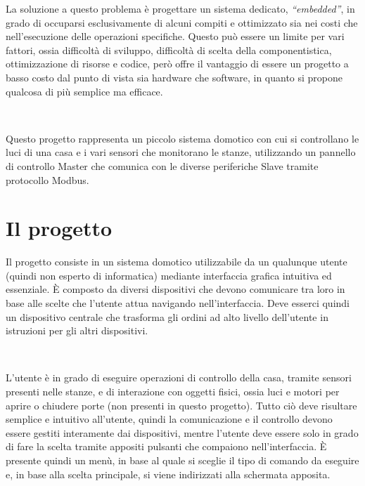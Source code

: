 \documentclass[a4paper,titlepage]{book}
\begin{document}
La soluzione a questo problema è progettare un sistema dedicato, \textit{``embedded''}, in grado di occuparsi esclusivamente di alcuni compiti e ottimizzato sia nei costi che nell'esecuzione delle operazioni specifiche. Questo può essere un limite per vari fattori, ossia difficoltà di sviluppo, difficoltà di scelta della componentistica, ottimizzazione di risorse e codice, però offre il vantaggio di essere un progetto a basso costo dal punto di vista sia hardware che software, in quanto si propone qualcosa di più semplice ma efficace.

~

Questo progetto rappresenta un piccolo sistema domotico con cui si controllano le luci di una casa e i vari sensori che monitorano le stanze, utilizzando un pannello di controllo Master che comunica con le diverse periferiche Slave tramite protocollo Modbus.


\tableofcontents




\chapter{Il progetto}

Il progetto consiste in un sistema domotico utilizzabile da un qualunque utente (quindi non esperto di informatica) mediante interfaccia grafica intuitiva ed essenziale. È composto da diversi dispositivi che devono comunicare tra loro in base alle scelte che l'utente attua navigando nell'interfaccia. Deve esserci quindi un dispositivo centrale che trasforma gli ordini ad alto livello dell'utente in istruzioni per gli altri dispositivi.

~

L'utente è in grado di eseguire operazioni di controllo della casa, tramite sensori presenti nelle stanze, e di interazione con oggetti fisici, ossia luci e motori per aprire o chiudere porte (non presenti in questo progetto). Tutto ciò deve risultare semplice e intuitivo all'utente, quindi la comunicazione e il controllo devono essere gestiti interamente dai dispositivi, mentre l'utente deve essere solo in grado di fare la scelta tramite appositi pulsanti che compaiono nell'interfaccia. È presente quindi un menù, in base al quale si sceglie il tipo di comando da eseguire e, in base alla scelta principale, si viene indirizzati alla schermata apposita.
\end{document}
